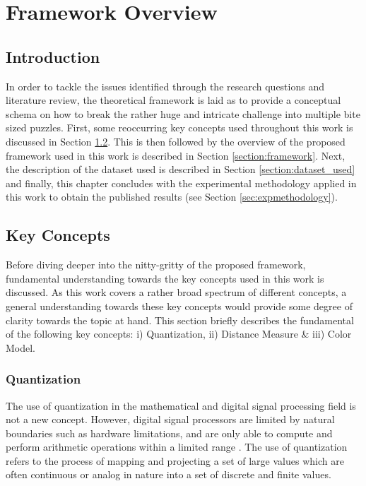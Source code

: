 \chapter{Framework Overview}

\section{Introduction}
In order to tackle the issues identified through the research questions and literature review, the theoretical framework is laid as to provide a conceptual schema on how to break the rather huge and intricate challenge into multiple bite sized puzzles. First, some reoccurring key concepts used throughout this work is discussed in Section \ref{section:keyconcepts}. This is then followed by the overview of the proposed framework used in this work is described in Section \ref{section:framework}. Next, the description of the dataset used is described in Section \ref{section:dataset_used} and finally, this chapter concludes with the experimental methodology applied in this work to obtain the published results (see Section \ref{sec:expmethodology}). 

\section{Key Concepts}
\label{section:keyconcepts}
Before diving deeper into the nitty-gritty of the proposed framework, fundamental understanding towards the key concepts used in this work is discussed. As this work covers a rather broad spectrum of different concepts, a general understanding towards these key concepts would provide some degree of clarity towards the topic at hand. This section briefly describes the fundamental of the following key concepts: i) Quantization, ii) Distance Measure \& iii) Color Model. 


\subsection{Quantization}

The use of quantization in the mathematical and digital signal processing field is not a new concept. However, digital signal processors are limited by natural boundaries such as hardware limitations, and are only able to compute and perform arithmetic operations within a limited range \cite{spors_2018}. The use of quantization refers to the process of mapping and projecting a set of large values which are often continuous or analog in nature into a set of discrete and finite values. 

